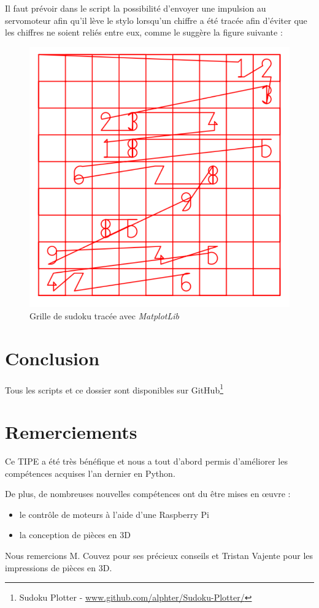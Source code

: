 \documentclass[12pt,a4paper]{report}
\begin{document}
Il faut prévoir dans le script la possibilité d'envoyer une impulsion au servomoteur afin qu'il lève le stylo lorsqu'un chiffre a été tracée afin d'éviter que les chiffres ne soient reliés entre eux, comme le suggère la figure suivante :

\begin{figure}[!h]
 \center
 \includegraphics[scale=0.45]{../pictures/Sudoku_relies}
 \caption{Grille de sudoku tracée avec \emph{MatplotLib}}
\end{figure}

\chapter*{Conclusion}
Tous les scripts et ce dossier sont disponibles sur GitHub\footnote{Sudoku Plotter - \url{www.github.com/alphter/Sudoku-Plotter/}}

\chapter*{Remerciements}
Ce TIPE a été très bénéfique et nous a tout d'abord permis d'améliorer les compétences acquises l'an dernier en Python.

De plus, de nombreuses nouvelles compétences ont du être mises en œuvre :

\begin{itemize}[label=--]
\item le contrôle de moteurs à l'aide d'une Raspberry Pi
\item la conception de pièces en 3D

\end{itemize}

Nous remercions M. Couvez pour ses précieux conseils et Tristan Vajente pour les impressions de pièces en 3D.


\end{document}
